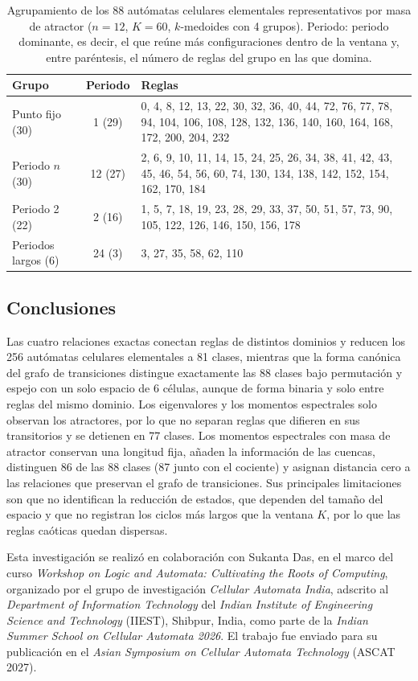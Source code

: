 \begin{table}[htbp]
	\centering
	\caption{Agrupamiento de los 88 autómatas celulares elementales representativos por masa de atractor ($n = 12$, $K = 60$, $k$-medoides con 4 grupos). Periodo: periodo dominante, es decir, el que reúne más configuraciones dentro de la ventana y, entre paréntesis, el número de reglas del grupo en las que domina.}
	\label{tab:clusters}
	\begin{tabular}{l c p{}}
		\hline
		Grupo & Periodo & Reglas \\
		\hline
		Punto fijo (30)     & 1 (29)  & 0, 4, 8, 12, 13, 22, 30, 32, 36, 40, 44, 72, 76, 77, 78, 94, 104, 106, 108, 128, 132, 136, 140, 160, 164, 168, 172, 200, 204, 232 \\
		Periodo $n$ (30)    & 12 (27) & 2, 6, 9, 10, 11, 14, 15, 24, 25, 26, 34, 38, 41, 42, 43, 45, 46, 54, 56, 60, 74, 130, 134, 138, 142, 152, 154, 162, 170, 184 \\
		Periodo 2 (22)      & 2 (16)  & 1, 5, 7, 18, 19, 23, 28, 29, 33, 37, 50, 51, 57, 73, 90, 105, 122, 126, 146, 150, 156, 178 \\
		Periodos largos (6) & 24 (3)  & 3, 27, 35, 58, 62, 110 \\
		\hline
	\end{tabular}
\end{table}


\subsection{Conclusiones}

Las cuatro relaciones exactas conectan reglas de distintos dominios y reducen los 256 autómatas celulares elementales a 81 clases, mientras que la forma canónica del grafo de transiciones distingue exactamente las 88 clases bajo permutación y espejo con un solo espacio de 6 células, aunque de forma binaria y solo entre reglas del mismo dominio. Los eigenvalores y los momentos espectrales solo observan los atractores, por lo que no separan reglas que difieren en sus transitorios y se detienen en 77 clases. Los momentos espectrales con masa de atractor conservan una longitud fija, añaden la información de las cuencas, distinguen 86 de las 88 clases (87 junto con el cociente) y asignan distancia cero a las relaciones que preservan el grafo de transiciones. Sus principales limitaciones son que no identifican la reducción de estados, que dependen del tamaño del espacio y que no registran los ciclos más largos que la ventana $K$, por lo que las reglas caóticas quedan dispersas.

Esta investigación se realizó en colaboración con Sukanta Das, en el marco del curso \textit{Workshop on Logic and Automata: Cultivating the Roots of Computing}, organizado por el grupo de investigación \textit{Cellular Automata India}, adscrito al \textit{Department of Information Technology} del \textit{Indian Institute of Engineering Science and Technology} (IIEST), Shibpur, India, como parte de la \textit{Indian Summer School on Cellular Automata 2026}. El trabajo fue enviado para su publicación en el \textit{Asian Symposium on Cellular Automata Technology} (ASCAT 2027).